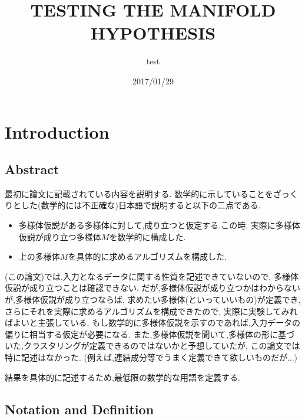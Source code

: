 \documentclass{jarticle}
\title{TESTING THE MANIFOLD HYPOTHESIS}
\author{test}
\date{2017/01/29}
\begin{document}
\section{Introduction}
\label{introduction}


\subsection{Abstract}
\label{sub:Abstract}

最初に論文に記載されている内容を説明する.
数学的に示していることをざっくりとした(数学的には不正確な)日本語で説明すると以下の二点である.
\begin{itemize}
  \item 多様体仮説がある多様体に対して,成り立つと仮定する.この時,
  実際に多様体仮説が成り立つ多様体$M$を数学的に構成した.
  \item 上の多様体$M$を具体的に求めるアルゴリズムを構成した.
\end{itemize}

(この論文)では,入力となるデータに関する性質を記述できていないので,
多様体仮説が成り立つことは確認できない.
だが,多様体仮説が成り立つかはわからないが,多様体仮説が成り立つならば,
求めたい多様体(といっていいもの)が定義でき,さらにそれを実際に求めるアルゴリズムを構成できたので,
実際に実験してみればよいと主張している.
もし数学的に多様体仮説を示すのであれば,入力データの偏りに相当する仮定が必要になる.
また,多様体仮説を聞いて,多様体の形に基づいた,クラスタリングが定義できるのではないかと予想していたが,
この論文では特に記述はなかった.
(例えば,連結成分等でうまく定義できて欲しいものだが...)

結果を具体的に記述するため,最低限の数学的な用語を定義する.
\subsection{Notation and Definition}
\label{sub:Notation and Definition}
\end{document}
